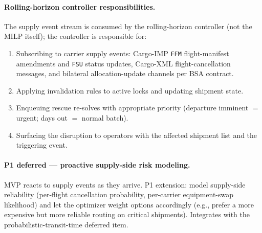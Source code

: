 \documentclass[11pt,a4paper]{article}
\theoremstyle{definition}
\begin{document}
\paragraph{Rolling-horizon controller responsibilities.}
The supply event stream is consumed by the rolling-horizon controller (not the MILP
itself); the controller is responsible for:
\begin{enumerate}[noitemsep]
  \item Subscribing to carrier supply events: Cargo-IMP \texttt{FFM} flight-manifest
        amendments and \texttt{FSU} status updates, Cargo-XML flight-cancellation
        messages, and bilateral allocation-update channels per BSA contract.
  \item Applying invalidation rules to active locks and updating shipment state.
  \item Enqueuing rescue re-solves with appropriate priority (departure imminent
        $=$ urgent; days out $=$ normal batch).
  \item Surfacing the disruption to operators with the affected shipment list and the
        triggering event.
\end{enumerate}

\paragraph{P1 deferred --- proactive supply-side risk modeling.}
MVP reacts to supply events as they arrive. P1 extension: model supply-side
reliability (per-flight cancellation probability, per-carrier equipment-swap
likelihood) and let the optimizer weight options accordingly (e.g., prefer a more
expensive but more reliable routing on critical shipments). Integrates with the
probabilistic-transit-time deferred item.
\end{document}
